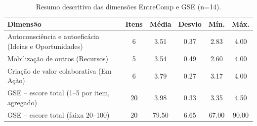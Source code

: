 \begin{table}[!htbp]
\centering
\caption{Resumo descritivo das dimensões EntreComp e GSE (n=14).}
\label{tab:competencias-resumo}
\small
\begin{tabular}{lccccc}
\hline
\textbf{Dimensão} & \textbf{Itens} & \textbf{Média} & \textbf{Desvio} & \textbf{Mín.} & \textbf{Máx.} \\
\hline
Autoconsciência e autoeficácia (Ideias e Oportunidades) & 6 & 3.51 & 0.37 & 2.83 & 4.00 \\
Mobilização de outros (Recursos) & 5 & 3.54 & 0.49 & 2.60 & 4.00 \\
Criação de valor colaborativa (Em Ação) & 6 & 3.79 & 0.27 & 3.17 & 4.00 \\
GSE -- escore total (1–5 por item, agregado) & 20 & 3.98 & 0.33 & 3.35 & 4.50 \\
GSE -- escore total (faixa 20–100) & 20 & 79.50 & 6.65 & 67.00 & 90.00 \\
\hline
\end{tabular}
\end{table}
